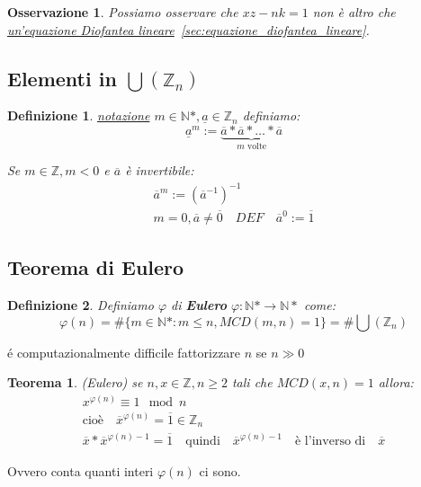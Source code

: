 \documentclass{article}
\newtheorem{theorem}{Teorema}[section]
\newtheorem{definition}{Definizione}[section]
\newtheorem{oss}{Osservazione}[section]
\begin{document}
\begin{oss}
       Possiamo osservare che $xz - nk = 1$ non è altro che \underline{un'equazione Diofantea lineare}~\ref{sec:equazione_diofantea_lineare}.
\end{oss}


\subsection{Elementi in $ \bigcup(\mathbb{Z}_n) $}
\begin{definition}
        \underline{notazione} $m \in \mathbb{N}*, \underline{a} \in \mathbb{Z}_n$ definiamo:
        \begin{equation*}
                \underline{a}^m := \underbrace{\overline{a} * \overline{a} * \ldots * \overline{a}}_{\mbox{$m$ volte}}
        \end{equation*}

        Se $m \in \mathbb{Z}, m < 0$ e $\overline{a}$ è invertibile:
        \begin{align*}
                \overline{a}^m := {(\overline{a}^{-1})}^{-1} \\
                m = 0, \overline{a} \not = \overline{0} \quad DEF \quad \overline{a}^0 := \overline{1}
        \end{align*}
\end{definition}



\subsection{Teorema di Eulero}\label{sec:teorema_di_eulero}
\begin{definition}
        Definiamo $\varphi$ di \textbf{Eulero} $\varphi : \mathbb{N}* \to \mathbb{N}*$ come:
        \begin{equation*}
                \varphi(n) = \# \{m \in \mathbb{N}* : m \le n, MCD(m,n)=1\} = \#\bigcup(\mathbb{Z}_n)
        \end{equation*}
\end{definition}

é computazionalmente difficile fattorizzare $n$ se $n \gg 0$


\begin{theorem}
        (Eulero) se $n,x \in \mathbb{Z}, n \ge 2$ tali che $ MCD(x,n) = 1 $ allora:
        \begin{align*}
                x^{\varphi(n)} \equiv 1 \mod n \\
                \mbox{cioè} \quad \overline{x}^{\varphi(n)} = \overline{1} \in \mathbb{Z}_n \\
                \overline{x} * \overline{x}^{\varphi(n)-1} = \overline{1} \quad \mbox{quindi} \quad \overline{x}^{\varphi(n)-1} \quad \mbox{è l'inverso di} \quad \overline{x}
        \end{align*}
\end{theorem}
Ovvero conta quanti interi $\varphi(n)$ ci sono.
\end{document}
